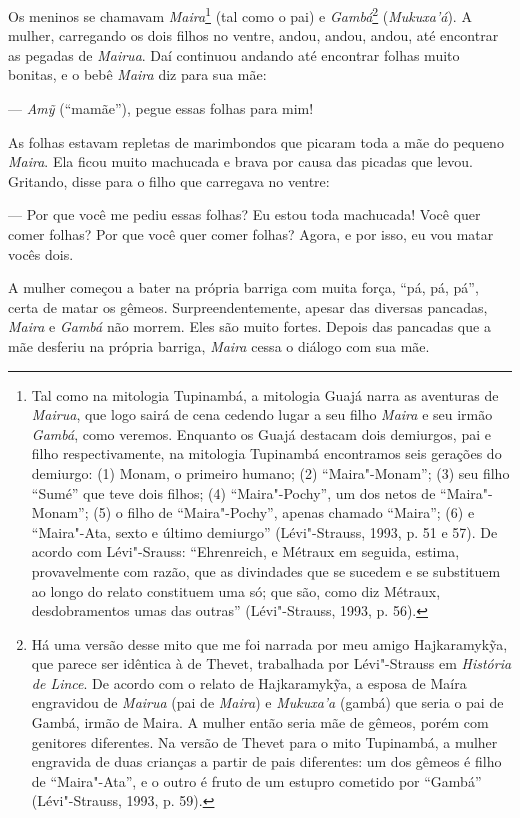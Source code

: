 Os meninos se chamavam \emph{Maira}\footnote{Tal como na mitologia
  Tupinambá, a mitologia Guajá narra as aventuras de \emph{Mairua}, que
  logo sairá de cena cedendo lugar a seu filho \emph{Maira} e seu irmão
  \emph{Gambá}, como veremos. Enquanto os Guajá destacam dois demiurgos,
  pai e filho respectivamente, na mitologia Tupinambá encontramos seis
  gerações do demiurgo: (1) Monam, o primeiro humano; (2) ``Maira"-Monam'';
  (3) seu filho ``Sumé'' que teve dois filhos; (4) ``Maira"-Pochy'', um dos
  netos de ``Maira"-Monam''; (5) o filho de ``Maira"-Pochy'', apenas chamado
  ``Maira''; (6) e ``Maira"-Ata, sexto e último demiurgo'' (Lévi"-Strauss,
  1993, p. 51 e 57). De acordo com Lévi"-Srauss: ``Ehrenreich, e Métraux em
      seguida, estima, provavelmente com razão, que as divindades que se
      sucedem e se substituem ao longo do relato constituem uma só; que são,
      como diz Métraux, desdobramentos umas das outras'' (Lévi"-Strauss, 1993,
  p. 56).} (tal como o pai) e \emph{Gambá}\footnote{Há uma versão desse
  mito que me foi narrada por meu amigo Hajkaramykỹa, que parece ser
  idêntica à de Thevet, trabalhada por Lévi"-Strauss em \emph{História de
  Lince}. De acordo com o relato de Hajkaramykỹa, a esposa de Maíra
  engravidou de \emph{Mairua} (pai de \emph{Maira}) e \emph{Mukuxa'a}
  (gambá) que seria o pai de Gambá, irmão de Maira. A mulher então seria
  mãe de gêmeos, porém com genitores diferentes. Na versão de Thevet
  para o mito Tupinambá, a mulher engravida de duas crianças a partir de
  pais diferentes: um dos gêmeos é filho de ``Maira"-Ata'', e o outro é
  fruto de um estupro cometido por ``Gambá'' (Lévi"-Strauss, 1993, p. 59).}
(\emph{Mukuxa'á}). A mulher, carregando os dois filhos no ventre, andou,
andou, andou, até encontrar as pegadas de \emph{Mairua}. Daí continuou
andando até encontrar folhas muito bonitas, e o bebê \emph{Maira} diz
para sua mãe:

--- \emph{Amỹ} (``mamãe''), pegue essas folhas para mim!

As folhas estavam repletas de marimbondos que picaram toda a mãe do
pequeno \emph{Maira}. Ela ficou muito machucada e brava por causa das
picadas que levou. Gritando, disse para o filho que carregava no ventre:

--- Por que você me pediu essas folhas? Eu estou toda machucada! Você quer
comer folhas? Por que você quer comer folhas? Agora, e por isso, eu vou
matar vocês dois.

A mulher começou a bater na própria barriga com muita força, ``pá, pá,
pá'', certa de matar os gêmeos. Surpreendentemente, apesar das diversas
pancadas, \emph{Maira} e \emph{Gambá} não morrem. Eles são muito fortes.
Depois das pancadas que a mãe desferiu na própria barriga, \emph{Maira}
cessa o diálogo com sua mãe.

